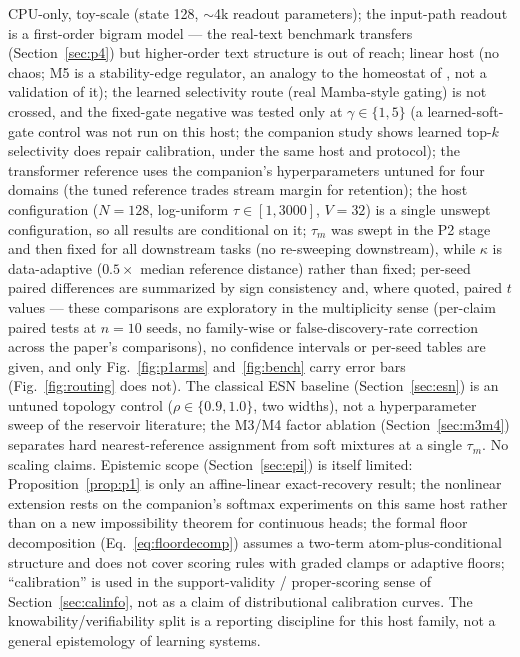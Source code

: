 \documentclass[preprint,12pt]{elsarticle}
\begin{document}
CPU-only, toy-scale (state 128, $\sim$4k readout parameters); the
input-path readout is a first-order bigram model --- the real-text
benchmark transfers (Section~\ref{sec:p4}) but higher-order text
structure is out of reach; linear host (no chaos; M5 is a
stability-edge regulator, an analogy to the
homeostat of \cite{redema,redemb}, not a validation of it); the learned
selectivity route (real Mamba-style gating) is not crossed, and the
fixed-gate negative was tested only at $\gamma \in \{1,5\}$ (a
learned-soft-gate control was not run on this host; the companion
study \cite{redemf} shows learned top-$k$ selectivity does repair
calibration, under the same host and protocol);
the
transformer reference uses the companion's hyperparameters untuned for
four domains (the tuned reference trades stream margin for retention);
the host configuration ($N=128$, log-uniform $\tau \in [1,3000]$,
$V=32$) is a single unswept configuration, so all results are
conditional on it; $\tau_m$ was swept in the P2 stage and then fixed
for all downstream tasks (no re-sweeping downstream), while $\kappa$ is
data-adaptive ($0.5 \times$ median reference distance) rather than
fixed; per-seed paired differences are summarized by sign consistency
and, where quoted, paired $t$ values --- these comparisons are
exploratory in the multiplicity sense (per-claim paired tests at $n=10$
seeds, no family-wise or false-discovery-rate correction across the
paper's comparisons), no confidence intervals or
per-seed tables are given, and only Fig.~\ref{fig:p1arms}
and~\ref{fig:bench} carry error bars (Fig.~\ref{fig:routing} does not).
The classical ESN baseline (Section~\ref{sec:esn}) is an untuned
topology control ($\rho\in\{0.9,1.0\}$, two widths), not a hyperparameter
sweep of the reservoir literature; the M3/M4 factor ablation
(Section~\ref{sec:m3m4}) separates hard nearest-reference assignment
from soft mixtures at a single $\tau_m$. No scaling claims.
Epistemic scope (Section~\ref{sec:epi}) is itself limited:
Proposition~\ref{prop:p1} is only an affine-linear exact-recovery
result; the nonlinear extension rests on the companion's softmax
experiments on this same host rather than on a new impossibility
theorem for continuous heads; the formal floor decomposition
(Eq.~\eqref{eq:floordecomp}) assumes a two-term atom-plus-conditional
structure and does not cover scoring rules with graded clamps or
adaptive floors; ``calibration'' is used in the support-validity /
proper-scoring sense of Section~\ref{sec:calinfo}, not as a claim of
distributional calibration curves. The knowability/verifiability split
is a reporting discipline for this host family, not a general
epistemology of learning systems.
\end{document}
